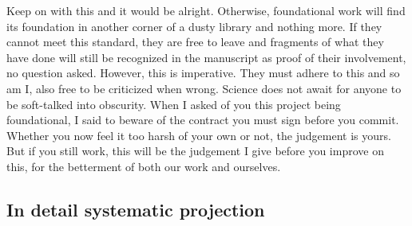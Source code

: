 Keep on with this and it would be alright. Otherwise, foundational work will find its foundation in another corner of a dusty library and nothing more. If they cannot meet this standard, they are free to leave and fragments of what they have done will still be recognized in the manuscript as proof of their involvement, no question asked. However, this is imperative. They must adhere to this and so am I, also free to be criticized when wrong. Science does not await for anyone to be soft-talked into obscurity. When I asked of you this project being foundational, I said to beware of the contract you must sign before you commit. Whether you now feel it too harsh of your own or not, the judgement is yours. But if you still work, this will be the judgement I give before you improve on this, for the betterment of both our work and ourselves.

\subsection{In detail systematic projection}


